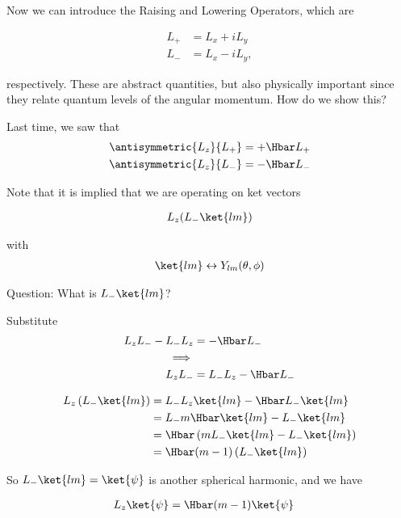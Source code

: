Now we can introduce the Raising and Lowering Operators, which are

\begin{align}\label{eqn:PHY356Foct19:1010}
L_{+} &= L_x + i L_y \\
L_{-} &= L_x - i L_y,
\end{align}

respectively.  These are abstract quantities, but also physically important since they relate quantum levels of the angular momentum.  How do we show this?

Last time, we saw that
\begin{align}\label{eqn:PHY356Foct19:1011}
\antisymmetric{L_z}{L_{+}} &= +\Hbar L_{+} \\
\antisymmetric{L_z}{L_{-}} &= -\Hbar L_{-}
\end{align}

Note that it is implied that we are operating on ket vectors

\begin{align*}
L_z (L_{-} \ket{lm} )
\end{align*}

with
\begin{align}\label{eqn:PHY356Foct19:1012}
\ket{lm} \leftrightarrow Y_{lm}(\theta, \phi)
\end{align}

Question: What is $L_{-} \ket{lm}$?

Substitute
\begin{align*}
L_z L_{-} - L_{-} L_z &= - \Hbar L_{-} \\
\implies \\
L_z L_{-} &= L_{-} L_z - \Hbar L_{-}
\end{align*}

\begin{align*}
L_z \left( L_{-} \ket{lm} \right)
&=
L_{-} L_z \ket{lm} - \Hbar L_{-} \ket{lm} \\
&=
L_{-} m \Hbar \ket{lm} - L_{-} \ket{lm} \\
&=
\Hbar \left( m L_{-} \ket{lm} - L_{-} \ket{lm} \right) \\
&=
\Hbar (m-1) \left( L_{-} \ket{lm} \right)
\end{align*}

So $L_{-} \ket{lm} = \ket{\psi}$ is another spherical harmonic, and we have

\begin{align}\label{eqn:PHY356Foct19:1013}
L_z \ket{\psi} &= \Hbar (m-1) \ket{\psi}
\end{align}

